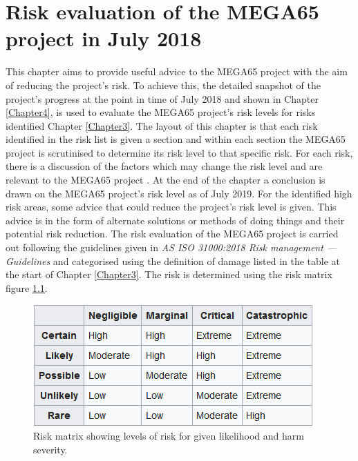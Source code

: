 
\chapter{Risk evaluation of the MEGA65 project in July 2018}
\label{Chapter5}
This chapter aims to provide useful advice to the MEGA65 project with the aim of reducing the project's risk. To achieve this, the detailed snapshot of the project's progress at the point in time of July 2018 and shown in Chapter \ref{Chapter4}, is used to evaluate the MEGA65 project's risk levels for risks identified Chapter \ref{Chapter3}. The layout of this chapter is that each risk identified in the risk list is given a section and within each section the MEGA65 project is scrutinised to determine its risk level to that specific risk. For each risk, there is a discussion of the factors which may change the risk level and are relevant to the MEGA65 project . At the end of the chapter a conclusion is drawn on the MEGA65 project's risk level as of July 2019. For the identified high risk areas, some advice that could reduce the project's risk level is given. This advice is in the form of alternate solutions or methods of doing things and their potential risk reduction. The risk evaluation of the MEGA65 project is carried out following the guidelines given in \textit{AS ISO 31000:2018 Risk management — Guidelines} 
\cite{RN164} and categorised using the definition of damage listed in the table at the start of Chapter \ref{Chapter3}. The risk is determined using the risk matrix figure \ref{riskmatrix}.

\begin{figure} \begin{center}
\includegraphics[width=.5\linewidth]{pics/riskmatrix} 
\end{center} 
\caption{Risk matrix showing levels of risk for given likelihood and harm severity.\\}
\label{riskmatrix}
\end{figure}

